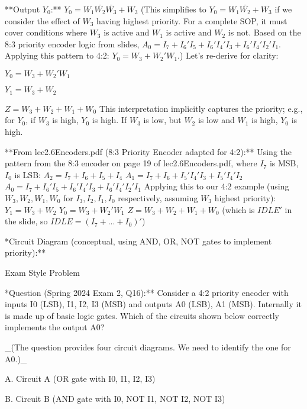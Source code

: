 \documentclass{article}
\begin{document}
         **Output $Y_0$:** $Y_0 = W_1\bar{W_2}\bar{W_3} + W_3$ (This simplifies to $Y_0 = W_1\bar{W_2} + W_3$ if we consider the effect of $W_3$ having highest priority. For a complete SOP, it must cover conditions where $W_3$ is active and $W_1$ is active and $W_2$ is not. Based on the 8:3 priority encoder logic from slides, $A_0 = I_7 + I_6'I_5 + I_6'I_4'I_3 + I_6'I_4'I_2'I_1$. Applying this pattern to 4:2: $Y_0 = W_3 + W_2'W_1$.) Let's re-derive for clarity:

            \item $Y_0 = W_3 + W_2'W_1$

            \item $Y_1 = W_3 + W_2$

            \item $Z = W_3 + W_2 + W_1 + W_0$ This interpretation implicitly captures the priority; e.g., for $Y_0$, if $W_3$ is high, $Y_0$ is high. If $W_3$ is low, but $W_2$ is low and $W_1$ is high, $Y_0$ is high.

         **From lec2.6Encoders.pdf (8:3 Priority Encoder adapted for 4:2):** Using the pattern from the 8:3 encoder on page 19 of lec2.6Encoders.pdf, where $I_7$ is MSB, $I_0$ is LSB: $A_2 = I_7 + I_6 + I_5 + I_4$ $A_1 = I_7 + I_6 + I_5'I_4'I_3 + I_5'I_4'I_2$ $A_0 = I_7 + I_6'I_5 + I_6'I_4'I_3 + I_6'I_4'I_2'I_1$ Applying this to our 4:2 example (using $W_3, W_2, W_1, W_0$ for $I_3, I_2, I_1, I_0$ respectively, assuming $W_3$ highest priority): $Y_1 = W_3 + W_2$ $Y_0 = W_3 + W_2'W_1$ $Z = W_3 + W_2 + W_1 + W_0$ (which is $IDLE'$ in the slide, so $IDLE = (I_7+...+I_0)'$)

    \item **Circuit Diagram (conceptual, using AND, OR, NOT gates to implement priority):** 

Exam Style Problem

\item **Question (Spring 2024 Exam 2, Q16):** Consider a 4:2 priority encoder with inputs I0 (LSB), I1, I2, I3 (MSB) and outputs A0 (LSB), A1 (MSB). Internally it is made up of basic logic gates. Which of the circuits shown below correctly implements the output A0?

\item \_(The question provides four circuit diagrams. We need to identify the one for A0.)\_

    \item A. Circuit A (OR gate with I0, I1, I2, I3)

    \item B. Circuit B (AND gate with I0, NOT I1, NOT I2, NOT I3)
\end{document}
